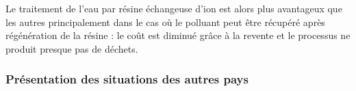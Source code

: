 \documentclass{article}
\begin{document}
Le traitement de l’eau par résine échangeuse d’ion est alors plus avantageux que les autres principalement dans le cas où le polluant peut être récupéré après régénération de la résine : le coût est diminué grâce à la revente et le processus ne produit presque pas de déchets.


\subsubsection{Présentation des situations des autres pays}

\end{document}

